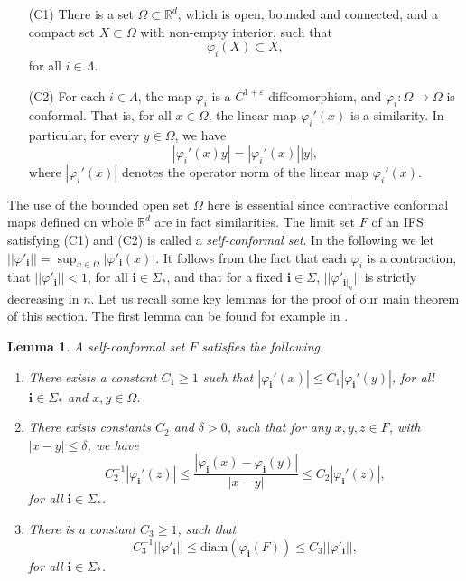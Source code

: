 \documentclass{PRM}
\newcommand{\field}[1]{\mathbb{#1}}
\newcommand{\R}{\field{R}}
\newcommand{\norm}[1]{\left|\left|#1\right|\right|}
\newcommand{\diam}{\mathrm{diam}}
\theoremstyle{plain}
\newtheorem{lemma}[thm]{Lemma}
\theoremstyle{definition}
\theoremstyle{remark}
\begin{document}
\begin{enumerate}
    \item[(C1)] There is a set $\Omega\subset \R^d$, which is open, bounded and connected, and a compact set $X\subset\Omega$ with non-empty interior, such that
    \begin{equation*}
        \varphi_{i}(X)\subset X,
    \end{equation*}
    for all $i\in\Lambda$.
    \item[(C2)] For each $i\in\Lambda$, the map $\varphi_i$ is a $C^{1+\varepsilon}$-diffeomorphism, and $\varphi_i\colon \Omega\to\Omega$ is conformal. That is, for all $x\in\Omega$, the linear map $\varphi_i'(x)$ is a similarity. In particular, for every $y\in \Omega$, we have
    \begin{equation*}
        |\varphi_i'(x)y|= |\varphi_i'(x)||y|,
    \end{equation*}
    where $|\varphi_i'(x)|$ denotes the operator norm of the linear map $\varphi_i'(x)$.
\end{enumerate}
The use of the bounded open set $\Omega$ here is essential since contractive conformal maps defined on whole $\R^d$ are in fact similarities. The limit set $F$ of an IFS satisfying (C1) and (C2) is called a \emph{self-conformal set}. In the following we let $||\varphi'_{\mathbf{i}}||=\sup_{x\in \Omega}|\varphi'_{\mathbf{i}}(x)|$. It follows from the fact that each $\varphi_i$ is a contraction, that $||\varphi'_{\mathbf{i}}||<1$, for all $\mathbf{i}\in\Sigma_*$, and that for a fixed $\mathbf{i}\in\Sigma$, $||\varphi'_{\mathbf{i}|_n}||$ is strictly decreasing in $n$. Let us recall some key lemmas for the proof of our main theorem of this section. The first lemma can be found for example in \cite{MU}.

\begin{lemma}\label{lemma:BDP}
A self-conformal set $F$ satisfies the following.

\begin{enumerate}
    \item There exists a constant $C_1\geq 1$ such that $|\varphi_{\mathbf{i}}'(x)|\leq C_1|\varphi_{\mathbf{i}}'(y)|$, for all $\mathbf{i}\in\Sigma_*$ and $x,y\in \Omega$.
    
    \item There exists constants $C_2$ and $\delta>0$, such that for any $x,y,z\in F$, with $|x-y|\leq \delta$, we have
    \begin{equation*}
        C_2^{-1}|\varphi_{\mathbf{i}}'(z)|\leq\frac{|\varphi_{\mathbf{i}}(x)-\varphi_{\mathbf{i}}(y)|}{|x-y|}\leq C_2|\varphi_{\mathbf{i}}'(z)|,
    \end{equation*}
    for all $\mathbf{i}\in\Sigma_*$.

    \item There is a constant $C_3\geq 1$, such that
    \begin{equation*}
        C_3^{-1}\norm{\varphi'_{\mathbf{i}}}\leq\diam(\varphi_{\mathbf{i}}(F)) \leq C_3\norm{\varphi'_{\mathbf{i}}},
    \end{equation*}
    for all $\mathbf{i}\in\Sigma_*$.
    
\end{enumerate}
\end{lemma}
\end{document}
